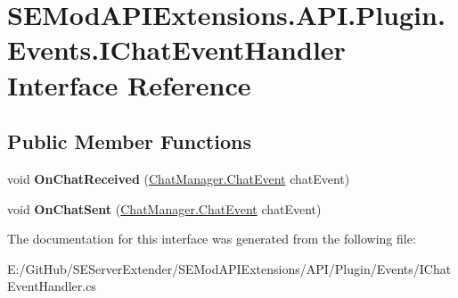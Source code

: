 \hypertarget{interface_s_e_mod_a_p_i_extensions_1_1_a_p_i_1_1_plugin_1_1_events_1_1_i_chat_event_handler}{}\section{S\+E\+Mod\+A\+P\+I\+Extensions.\+A\+P\+I.\+Plugin.\+Events.\+I\+Chat\+Event\+Handler Interface Reference}
\label{interface_s_e_mod_a_p_i_extensions_1_1_a_p_i_1_1_plugin_1_1_events_1_1_i_chat_event_handler}
\subsection*{Public Member Functions}
\begin{DoxyCompactItemize}
\item 
\hypertarget{interface_s_e_mod_a_p_i_extensions_1_1_a_p_i_1_1_plugin_1_1_events_1_1_i_chat_event_handler_aa70c0f6059ed88abf226c5956e8859c6}{}void {\bfseries On\+Chat\+Received} (\hyperlink{struct_s_e_mod_a_p_i_extensions_1_1_a_p_i_1_1_chat_manager_1_1_chat_event}{Chat\+Manager.\+Chat\+Event} chat\+Event)\label{interface_s_e_mod_a_p_i_extensions_1_1_a_p_i_1_1_plugin_1_1_events_1_1_i_chat_event_handler_aa70c0f6059ed88abf226c5956e8859c6}

\item 
\hypertarget{interface_s_e_mod_a_p_i_extensions_1_1_a_p_i_1_1_plugin_1_1_events_1_1_i_chat_event_handler_a7f6ce6fb14be10490df52b83ce057b94}{}void {\bfseries On\+Chat\+Sent} (\hyperlink{struct_s_e_mod_a_p_i_extensions_1_1_a_p_i_1_1_chat_manager_1_1_chat_event}{Chat\+Manager.\+Chat\+Event} chat\+Event)\label{interface_s_e_mod_a_p_i_extensions_1_1_a_p_i_1_1_plugin_1_1_events_1_1_i_chat_event_handler_a7f6ce6fb14be10490df52b83ce057b94}

\end{DoxyCompactItemize}


The documentation for this interface was generated from the following file\+:\begin{DoxyCompactItemize}
\item 
E\+:/\+Git\+Hub/\+S\+E\+Server\+Extender/\+S\+E\+Mod\+A\+P\+I\+Extensions/\+A\+P\+I/\+Plugin/\+Events/I\+Chat\+Event\+Handler.\+cs\end{DoxyCompactItemize}
